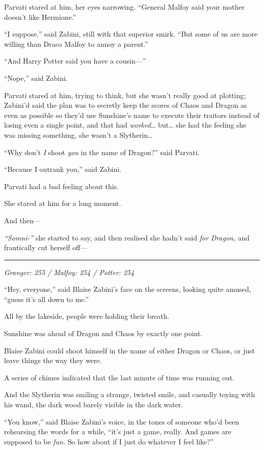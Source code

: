 Parvati stared at him, her eyes narrowing. ``General Malfoy said your
mother doesn't like Hermione.''

``I suppose,'' said Zabini, still with that superior smirk. ``But some
of us are more willing than Draco Malfoy to annoy a parent.''

``And Harry Potter said you have a cousin---''

``Nope,'' said Zabini.

Parvati stared at him, trying to think, but she wasn't really good at
plotting; Zabini'd said the plan was to secretly keep the scores of
Chaos and Dragon as even as possible so they'd use Sunshine's name to
execute their traitors instead of losing even a single point, and that
had \emph{worked}\ldots{} but\ldots{} she had the feeling she was
missing something, she wasn't a Slytherin\ldots{}

``Why don't \emph{I} shoot \emph{you} in the name of Dragon?'' said
Parvati.

``Because I outrank you,'' said Zabini.

Parvati had a bad feeling about this.

She stared at him for a long moment.

And then---

\emph{``Somni-''} she started to say, and then realised she hadn't said
\emph{for Dragon,} and frantically cut herself off---

\begin{center}\rule{3in}{0.4pt}\end{center}

\emph{Granger: 255 / Malfoy: 254 / Potter: 254}

``Hey, everyone,'' said Blaise Zabini's face on the screens, looking
quite amused, ``guess it's all down to me.''

All by the lakeside, people were holding their breath.

Sunshine was ahead of Dragon and Chaos by exactly one point.

Blaise Zabini could shoot himself in the name of either Dragon or Chaos,
or just leave things the way they were.

A series of chimes indicated that the last minute of time was running
out.

And the Slytherin was smiling a strange, twisted smile, and casually
toying with his wand, the dark wood barely visible in the dark water.

``You know,'' said Blaise Zabini's voice, in the tones of someone who'd
been rehearsing the words for a while, ``it's just a game, really. And
games are supposed to be \emph{fun.} So how about if I just do whatever
I feel like?''
